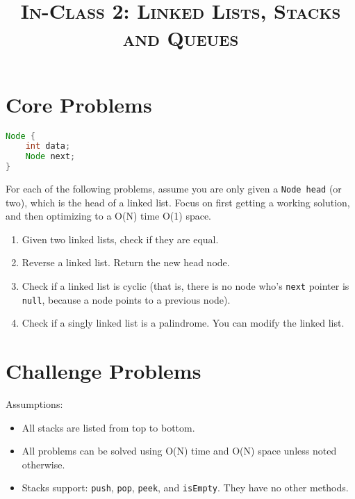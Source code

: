\documentclass{article}
\title{\large{\textsc{In-Class 2: Linked Lists, Stacks and Queues}}}
\date{}
\begin{document}
\maketitle

\section*{Core Problems}

\begin{lstlisting}[language=Java]
Node {
    int data;
    Node next;
}

\end{lstlisting}

\noindent For each of the following problems, assume you are only given a \texttt{Node head} (or two), which is the head of a linked list. Focus on first getting a working solution, and then optimizing to a O(N) time O(1) space.

\begin{enumerate}

\setcounter{enumi}{0}

\item Given two linked lists, check if they are equal.

\item Reverse a linked list. Return the new head node.

\item Check if a linked list is cyclic (that is, there is no node who's \texttt{next} pointer is \texttt{null}, because a node points to a previous node).

\item Check if a singly linked list is a palindrome. You can modify the linked list.

\end{enumerate}

\subsection*{}

\section*{Challenge Problems}

Assumptions:

\begin{itemize}
  \item All stacks are listed from top to bottom.
  \item All problems can be solved using O(N) time and O(N) space unless noted otherwise.
  \item Stacks support: \texttt{push}, \texttt{pop}, \texttt{peek}, and \texttt{isEmpty}. They have no other methods.
\end{itemize}
\end{document}

